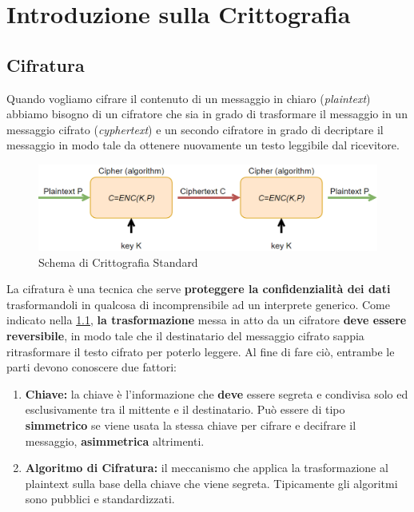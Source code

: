 \chapter{Introduzione sulla Crittografia}
\section{Cifratura}
Quando vogliamo cifrare il contenuto di un messaggio in chiaro (\emph{plaintext}) abbiamo bisogno di un cifratore che sia in grado di trasformare il messaggio in un messaggio cifrato (\emph{cyphertext}) e un secondo cifratore in grado di decriptare il messaggio in modo tale da ottenere nuovamente un testo leggibile dal ricevitore. 
\begin{figure}[h]
    \centering
    \includegraphics[width=\textwidth]{image/enc_exemple.png}
    \caption{Schema di Crittografia Standard}
    \label{fig:enc_exemple}
\end{figure}
La cifratura è una tecnica che serve \textbf{proteggere la confidenzialità dei dati} trasformandoli in qualcosa di incomprensibile ad un interprete generico. Come indicato nella \cref{fig:enc_exemple}, \textbf{la trasformazione} messa in atto da un cifratore \textbf{deve essere reversibile}, in modo tale che il destinatario del messaggio cifrato sappia ritrasformare il testo cifrato per poterlo leggere. Al fine di fare ciò, entrambe le parti devono conoscere due fattori:
\begin{enumerate}
    \item \textbf{Chiave:} la chiave è l'informazione che \textbf{deve} essere segreta e condivisa solo ed esclusivamente tra il mittente e il destinatario. Può essere di tipo \textbf{simmetrico} se viene usata la stessa chiave per cifrare e decifrare il messaggio, \textbf{asimmetrica} altrimenti. 
    \item \textbf{Algoritmo di Cifratura:} il meccanismo che applica la trasformazione al plaintext sulla base della chiave che viene segreta. Tipicamente gli algoritmi sono pubblici e standardizzati. 
\end{enumerate}
